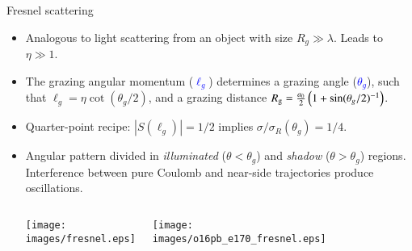 \documentclass[english,10pt]{beamer}
\newcommand{\bi}{\begin{itemize}}
\newcommand{\images}{images}
\begin{document}
\begin{frame}[fragile]{Fresnel scattering}

{\small

\bi
\item Analogous to light scattering from an object with size $R_g \gg \lambda$. Leads to $\eta \gg 1$.
\item The grazing angular momentum (\textcolor{blue}{$\ell_g$})  determines a grazing angle (\textcolor{blue}{$\theta_g$}), such that  $\ell_g = \eta \cot(\theta_g/2) $, and a  grazing distance $R_{\rm g}=
\frac{a_0}{2} \left( 1+\sin(\theta_g/2)^{-1} \right)$. 

\item Quarter-point recipe: $|S(\ell_g)| = 1/2$ implies $\sigma/\sigma_R(\theta_g) =1/4$.

\item Angular pattern divided in {\it illuminated} ($\theta<\theta_g$) and {\it shadow} ($\theta>\theta_g$) regions. Interference between pure Coulomb and near-side trajectories produce oscillations.


\begin{columns}
\begin{center}
    \texttt{[image: \\images/fresnel.eps]}
\end{center}
\begin{center}
    \texttt{[image: \\images/o16pb\_e170\_fresnel.eps]}
\end{center}

\end{columns}








\end{itemize}
}

\end{frame}
\end{document}
